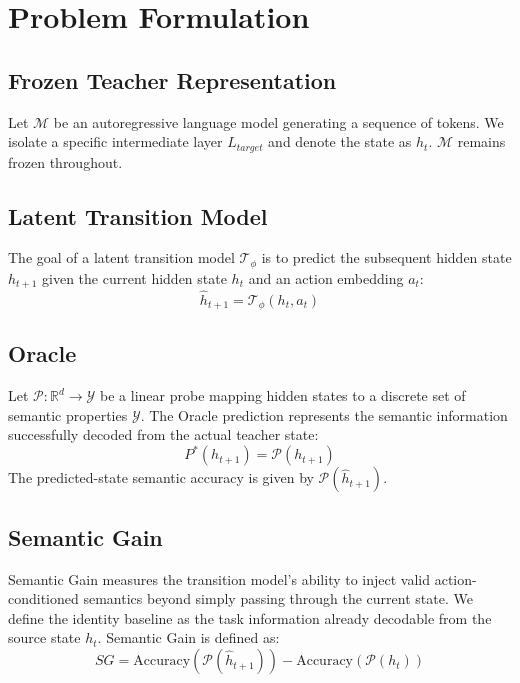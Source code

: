 \documentclass[conference]{IEEEtran}
\begin{document}
\section{Problem Formulation}

\subsection{Frozen Teacher Representation}
Let $\mathcal{M}$ be an autoregressive language model generating a sequence of tokens. We isolate a specific intermediate layer $L_{target}$ and denote the state as $h_t$. $\mathcal{M}$ remains frozen throughout.

\subsection{Latent Transition Model}
The goal of a latent transition model $\mathcal{T}_\phi$ is to predict the subsequent hidden state $h_{t+1}$ given the current hidden state $h_t$ and an action embedding $a_t$:
\begin{equation}
\hat h_{t+1} = \mathcal{T}_\phi(h_t, a_t)
\end{equation}

\subsection{Oracle}
Let $\mathcal{P} : \mathbb{R}^d \rightarrow \mathcal{Y}$ be a linear probe mapping hidden states to a discrete set of semantic properties $\mathcal{Y}$. The Oracle prediction represents the semantic information successfully decoded from the actual teacher state:
\begin{equation}
P^*(h_{t+1}) = \mathcal{P}(h_{t+1})
\end{equation}
The predicted-state semantic accuracy is given by $\mathcal{P}(\hat h_{t+1})$.

\subsection{Semantic Gain}
Semantic Gain measures the transition model's ability to inject valid action-conditioned semantics beyond simply passing through the current state. We define the identity baseline as the task information already decodable from the source state $h_t$. Semantic Gain is defined as:
\begin{equation}
SG = \text{Accuracy}(\mathcal{P}(\hat h_{t+1})) - \text{Accuracy}(\mathcal{P}(h_t))
\end{equation}
\end{document}

